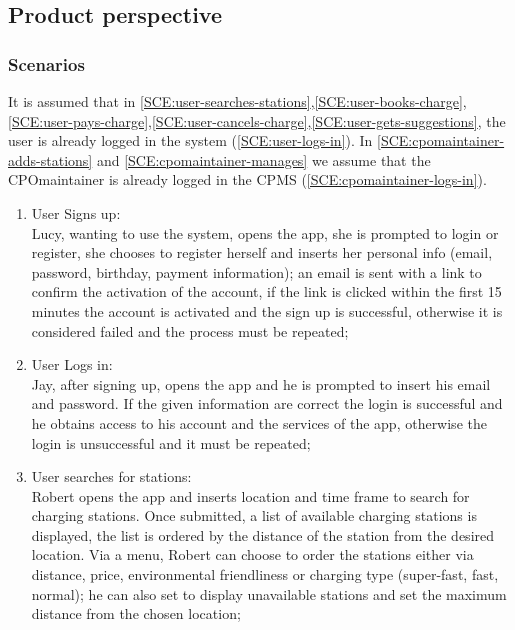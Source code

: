 \subsection{Product perspective}

\subsubsection{Scenarios}
It is assumed that in \ref{SCE:user-searches-stations},\ref{SCE:user-books-charge},\ref{SCE:user-pays-charge},\ref{SCE:user-cancels-charge},\ref{SCE:user-gets-suggestions}, the user is already logged in the system (\ref{SCE:user-logs-in}). In \ref{SCE:cpomaintainer-adds-stations} and \ref{SCE:cpomaintainer-manages} we assume that the \ac{CPO}maintainer is already logged in the \ac{CPMS} (\ref{SCE:cpomaintainer-logs-in}).
\begin{enumerate}[label=\textbf{S\arabic*}]
    \item User Signs up:\\
          Lucy, wanting to use the system, opens the app, she is prompted to login or register,
          she chooses to register herself and inserts her personal info (email, password, birthday, payment information);
          an email is sent with a link to confirm the activation of the account, if the link is clicked within
          the first 15 minutes the account is activated and the sign up is successful,
          otherwise it is considered failed and the process must be repeated;\label{SCE:user-signs-up}
    \item User Logs in:\\
          Jay, after signing up, opens the app and he is prompted to insert his email and password.
          If the given information are correct the login is successful and he obtains access to his account
          and the services of the app, otherwise the login is unsuccessful and it must be repeated;\label{SCE:user-logs-in}
    \item User searches for stations:\\
          Robert opens the app and inserts location and time frame to search for charging stations.
          Once submitted, a list of available charging stations is displayed, the list is ordered by the distance of the station
          from the desired location. Via a menu, Robert can choose to order the stations either via distance, price, environmental friendliness or charging type (super-fast, fast, normal); he can also set to display unavailable stations and set the maximum distance from the chosen location;\label{SCE:user-searches-stations}

\end{enumerate}
